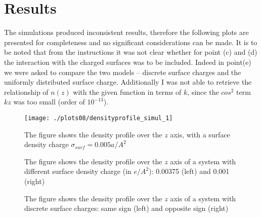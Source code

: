 \documentclass[aps,pra,reprint, onecolumn, rmp]{revtex4-2}
\begin{document}
\section{Results}
The simulations produced inconsistent results, therefore the following plots are presented for completeness and no significant considerations can be made. It is to be noted that from the instructions it was not clear whether for point (c) and (d) the interaction with the charged surfaces was to be included. Indeed in point(e) we were asked to compare the two models -- discrete surface charges and the uniformly distributed surface charge. Additionally I was not able to retrieve the relationship of $n(z)$ with the given function in terms of $k$, since the $cos^2$ term $kz$ was too small (order of $10^{-13}$).


\begin{figure}[h]
          \centering
          \texttt{[image: ./plots08/densityprofile\_simul\_1]}
          \caption{The figure shows the density profile over the $z$ axis, with a surface density charge $\sigma_{surf} = 0.005a/A^2$}
\end{figure}

\begin{figure}[th]
     \centering
     \caption{The figure shows the density profile over the $z$ axis of a system with different surface density charge (in $e/A^2$): 0.00375 (left) and 0.001 (right) }
    
\end{figure}

\begin{figure}[h]
     \centering
     \caption{The figure shows the density profile over the $z$ axis of a system with discrete surface charges: same sign (left) and opposite sign (right)}
    
\end{figure}
\end{document}
